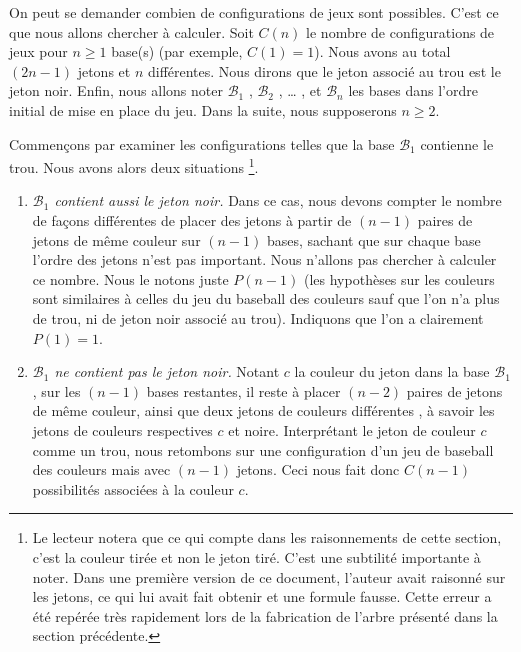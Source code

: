 On peut se demander combien de configurations de jeux sont possibles. C'est ce que nous allons chercher à calculer. Soit $C(n)$ le nombre de configurations de jeux pour $n \geqslant 1$ base(s) (par exemple, $C(1) = 1$). Nous avons au total $(2n - 1)$ jetons et $n$  différentes.
Nous dirons que le jeton associé au trou est le jeton noir.
Enfin, nous allons noter $\mathcal{B}_1$ , $\mathcal{B}_2$ , \dots{} , et  $\mathcal{B}_n$ les bases  dans l'ordre initial de mise en place du jeu. Dans la suite, nous supposerons $n \geqslant 2$.


\medskip

Commençons par examiner les configurations telles que la base $\mathcal{B}_1$ contienne le trou. Nous avons alors deux situations
\footnote{
    Le lecteur notera que ce qui compte dans les raisonnements de cette section, c'est la couleur tirée et non le jeton tiré. C'est une subtilité importante à noter.
    Dans une première version de ce document, l'auteur avait raisonné sur les jetons, ce qui lui avait fait obtenir et  une formule fausse.
    Cette erreur a été repérée très rapidement lors de la fabrication de l'arbre présenté dans la section précédente.
}.

\begin{enumerate}
    \item \textit{$\mathcal{B}_1$ contient aussi le jeton noir.}
    Dans ce cas, nous devons compter le nombre de façons différentes de placer des jetons à partir de $(n - 1)$ paires de jetons de même couleur sur $(n-1)$ bases, sachant que sur chaque base l'ordre des jetons n'est pas important. Nous n'allons pas chercher à calculer ce nombre. Nous le notons juste $P(n - 1)$ (les hypothèses sur les couleurs sont similaires à celles du jeu du baseball des couleurs sauf que l'on n'a plus de trou, ni de jeton noir associé au trou). Indiquons que l'on a clairement $P(1) = 1$.

    \item \textit{$\mathcal{B}_1$ ne contient pas le jeton noir.}
    Notant $c$ la couleur du jeton dans la base $\mathcal{B}_1$, sur les $(n-1)$ bases restantes, il reste à placer $(n - 2)$ paires de jetons de même couleur, ainsi que deux jetons de couleurs différentes , à savoir les jetons de couleurs respectives $c$ et noire. Interprétant le jeton de couleur $c$ comme un trou, nous retombons sur une configuration d'un jeu de baseball des couleurs mais avec $(n-1)$ jetons. Ceci nous fait donc $C(n -1)$ possibilités associées à la couleur $c$.
\end{enumerate}


